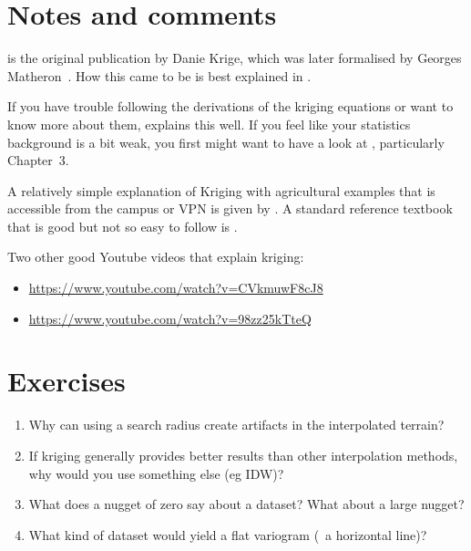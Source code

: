 %
\section{Notes and comments}

\citet{Krige51} is the original publication by Danie Krige, which was later formalised by Georges Matheron~\citep{Matheron62,Matheron65}.
How this came to be is best explained in \citet{cressie93}.

If you have trouble following the derivations of the kriging equations or want to know more about them, \citet{Lichtenstern13} explains this well.
If you feel like your statistics background is a bit weak, you first might want to have a look at \citet{Fewster14}, particularly Chapter~3.

A relatively simple explanation of Kriging with agricultural examples that is accessible from the campus or VPN is given by \citet{Oliver15}.
A standard reference textbook that is good but not so easy to follow is \citet{Wackernagel03}.

Two other good Youtube videos that explain kriging:
\begin{itemize}
\item \url{https://www.youtube.com/watch?v=CVkmuwF8cJ8}
\item \url{https://www.youtube.com/watch?v=98zz25kTteQ}
\end{itemize}

%
\section{Exercises}

\begin{enumerate}
\item Why can using a search radius create artifacts in the interpolated terrain?
\item If kriging generally provides better results than other interpolation methods, why would you use something else (eg IDW)?
\item What does a nugget of zero say about a dataset? What about a large nugget?
\item What kind of dataset would yield a flat variogram (\ie\ a horizontal line)?
\end{enumerate}